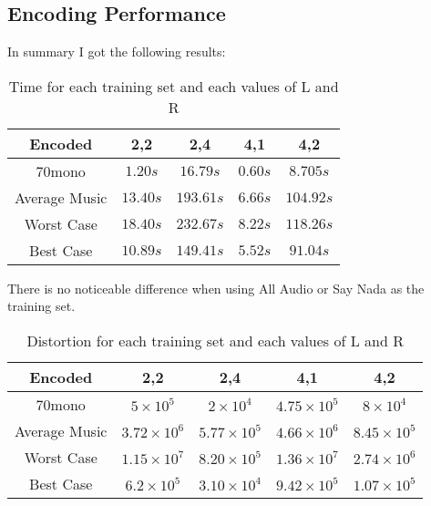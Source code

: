 \documentclass[a4paper, 11pt]{article}
\begin{document}
		\subsection{Encoding Performance}
			In summary I got the following results:
			
			\begin{table}[H]
				\centering
				\begin{tabular}{c|c|c|c|c}
					\textbf{Encoded}	& \textbf{2,2} 	& \textbf{2,4}	& \textbf{4,1} & \textbf{4,2}\\ \hline
					70mono					& $ 1.20 s $ 	& $ 16.79 s $	& $ 0.60 s $ 	& $ 8.70 5 s $	\\ \hline
					Average Music			& $ 13.40 s $	& $ 193.61 s $	& $ 6.66 s $ 	& $ 104.92 s $	\\ \hline	
					Worst Case				& $ 18.40 s $	& $	232.67 s $	& $ 8.22 s $	& $	118.26 s $	\\ \hline
					Best Case				& $ 10.89 s $	& $	149.41 s $	& $ 5.52 s $	& $	91.04 s $	\\
				\end{tabular}
				\caption{Time for each training set and each values of L and R}
				\label{table:EncodeTime}
			\end{table}
			There is no noticeable difference when using All Audio or Say Nada as the training set.
			
			\begin{table}[H]
				\centering
				\begin{tabular}{c|c|c|c|c}
					\textbf{Encoded} & \textbf{2,2} 			& \textbf{2,4}			&  \textbf{4,1}				& \textbf{4,2} \\ \hline
					70mono			& $ 5 \times 10^{5} $ 		& $ 2 \times 10^{4} $	& $4.75 \times 10^{5} $ 	& $ 8 \times 10^{4} $ \\ \hline
					Average Music	& $ 3.72 \times 10^{6} $ 	& $ 5.77 \times 10^{5} $& $ 4.66 \times 10^{6} $  	& $ 8.45 \times 10^{5} $ \\ \hline	
					Worst Case 		& $ 1.15 \times 10^{7} $	& $	8.20 \times 10^{5} $& $ 1.36 \times 10^{7} $	& $ 2.74 \times 10^6 $ \\ \hline
					Best Case 		& $ 6.2 \times 10^{5} $		& $	3.10 \times 10^{4} $& $ 9.42 \times 10^{5} $ 	& $	1.07 \times 10^5 $ \\
				\end{tabular}
				\caption{Distortion for each training set and each values of L and R}
				\label{table:EncodeDist}
			\end{table}
		
\end{document}
